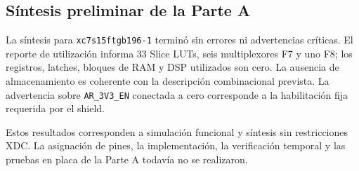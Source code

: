 \subsection{Síntesis preliminar de la Parte A}
La síntesis para \texttt{xc7s15ftgb196-1} terminó sin errores ni
advertencias críticas. El reporte de utilización informa 33 Slice
LUTs, seis multiplexores F7 y uno F8; los registros, latches, bloques
de RAM y DSP utilizados son cero. La ausencia de almacenamiento es
coherente con la descripción combinacional prevista. La advertencia
sobre \texttt{AR\_3V3\_EN} conectada a cero corresponde a la
habilitación fija requerida por el shield.

Estos resultados corresponden a simulación funcional y síntesis
sin restricciones XDC. La asignación de pines, la implementación,
la verificación temporal y las pruebas en placa de la Parte A
todavía no se realizaron.
